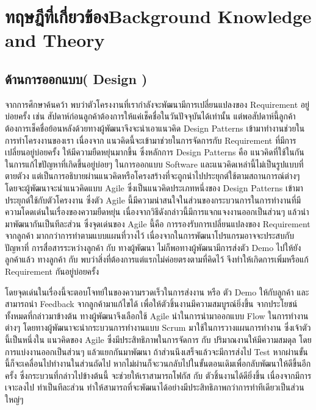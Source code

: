 \chapter{\ifcpe ทฤษฎีที่เกี่ยวข้อง\else Background Knowledge and Theory\fi}


\section{ด้านการออกแบบ( Design )}
จากการศึกษาค้นคว้า พบว่าตัวโครงงานที่เรากำลังจะพัฒนามีการเปลี่ยนแปลงของ Requirement อยู่บ่อยครั้ง เช่น สัปดาห์ก่อนลูกค้าต้องการให้แค่เช็คชื่อในวันปัจจุบันได้เท่านั้น  แต่พอสัปดาห์นี้ลูกค้าต้องการเช็คชื่อย้อนหลังด้วยทางผู้พัฒนาจึงจะนำเอาแนวคิด Design Patterns \cite{designPatterns} เข้ามาทำงานช่วยในการทำโครงงานของเรา เนื่องจาก แนวคิดนี้จะเข้ามาช่วยในการจัดการกับ Requirement ที่มีการเปลี่ยนอยู่บ่อยครั้ง ให้มีความยืดหยุ่นมากขึ้น
ซึ่งหลักการ Design Patterns คือ แนวคิดที่ใช้ในกันในการแก้ไขปัญหาที่เกิดขึ้นอยู่บ่อยๆ ในการออกแบบ Software และแนวคิดเหล่านี้ไม่เป็นรูปแบบที่ตายตัวง แต่เป็นการอธิบายผ่านแนวคิดหรือโครงสร้างที่จะถูกนำไปประยุกต์ใช้ตามสถานการณ์ต่างๆ  
โดยจะผู้พัฒนาจะนำแนวคิดแบบ Agile \cite{agile}  ซึ่งเป็นแนวคิดประเภทหนึ่งของ Design Patterns เข้ามาประยุกต์ใช้กับตัวโครงงาน   ซึ่งตัว Agile นี้มีความน่าสนใจในส่วนของกระบวนการในการทำงานที่มีความโดดเด่นในเรื่องของความยืดหยุ่น  เนื่องจากวิธีดังกล่าวนี้มีการแจกแจงงานออกเป็นส่วนๆ  แล้วนำมาพัฒนากันเป็นทีละส่วน  
ซึ่งจุดเด่นของ Agile นี้คือ การรองรับการเปลี่ยนแปลงของ Requirement จากลูกค้า มากกว่าการทำตามแบบแผนที่วางไว้  เนื่องจากในการพัฒนาโปรแกรมอาจจะประสบกับปัญหาที่ การสื่อสารระหว่างลูกค้า กับ ทางผู้พัฒนา ไม่ก็พอทางผู้พัฒนามีการส่งตัว Demo ไปให้ยังลูกค้าแล้ว ทางลูกค้า กับ พบว่าสิ่งที่ต้องการแต่แรกไม่ค่อยตรงตามที่คิดไว้  จึงทำให้เกิดการเพิ่มหรือแก้ Requirement กันอยู่บ่อยครั้ง

โดยจุดเด่นในเรื่องนี้จะตอบโจทย์ในของความรวดเร็วในการส่งงาน หรือ ตัว Demo ให้กับลูกค้า และ  สามารถนำ Feedback จากลูกค้ามาแก้ไขได้ เพื่อให้ตัวชิ้นงานมีความสมบูรณ์ยิ่งขึ้น 
 จากประโยชน์ทั้งหมดที่กล่าวมาข้างต้น ทางผู้พัฒนาจึงเลือกใช้ Agile นำในการนำมาออกแบบ Flow ในการทำงานต่างๆ  โดยทางผู้พัฒนาจะนำกระบวนการทำงานแบบ Scrum \cite{srcum} มาใช้ในการวางแผนการทำงาน 
ซึ่งเจ้าตัวนี้เป็นหนึ่งใน แนวคิดของ Agile ซึ่งมีประสิทธิภาพในการจัดการ กับ ปริมาณงานให้มีความสมดุล  โดยการแบ่งงานออกเป็นส่วนๆ แล้วแยกกันมาพัฒนา  ถ้าส่วนนึงเสร็จแล้วจะมีการส่งไป Test  หากผ่านขั้นนี้ก็จะเคลื่อนไปทำงานในส่วนถัดไป  หากไม่ผ่านก็จะวนกลับไปในขั้นตอนเดิมเพื่อกลับพัฒนาให้ดีขึ้นอีกครั้ง ซึ่งกระบวนที่กล่าวไปข้างต้นนี้  จะช่วยให้เราสามารถโฟกัส กับ ตัวชิ้นงานได้ดียิ่งขึ้น เนื่องจากมีการเจาะลงไป ทำเป็นทีละส่วน ทำให้สามารถที่จะพัฒนาได้อย่างมีประสิทธิภาพกว่าการทำทีเดียวเป็นส่วนใหญ่ๆ

